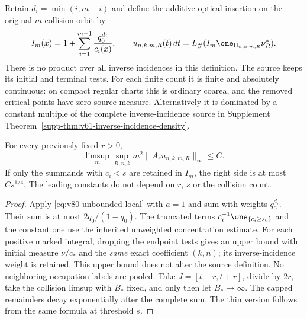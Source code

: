 Retain $d_i=\min(i,m-i)$ and define the additive optical insertion
on the original $m$-collision orbit by
\begin{equation}\label{eq:v80-depth-insertion}
 I_m(x)=1+\sum_{i=1}^{m-1}\frac{q_0^{d_i}}{c_i(x)},\qquad
 u_{n,k,m,R}(t)\,dt
       =L_\#(I_m\one_{\Pi_{n,k,m,R}}\nu_R^*).
\end{equation}
There is no product over all inverse incidences in this definition.
The source keeps its initial and terminal tests. For each finite
count it is finite and absolutely continuous: on compact regular
charts this is ordinary coarea, and the removed critical points
have zero source measure. Alternatively it is dominated by a
constant multiple of the complete inverse-incidence source in
Supplement Theorem~\ref{supp-thm:v61-inverse-incidence-density}.

\begin{corollary}
\label{cor:v80-depth-source}
For every previously fixed $r>0$,
\begin{equation}\label{eq:v80-depth-source}
 \limsup_m\sup_{R,n,k}m^2\|A_r u_{n,k,m,R}\|_\infty\le C.
\end{equation}
If only the summands with $c_i<s$ are retained in $I_m$, the right
side is at most $Cs^{1/4}$. The leading constants do not depend on
$r$, $s$ or the collision count.
\end{corollary}
\begin{proof}
Apply \eqref{eq:v80-unbounded-local} with $a=1$ and sum with
weights $q_0^{d_i}$. Their sum is at most $2q_0/(1-q_0)$.
The truncated terms $c_i^{-1}\one_{\{c_i\ge s_0\}}$ and the
constant one use the inherited unweighted concentration estimate.
For each positive marked integral, dropping the endpoint tests
gives an upper bound with initial measure $\nu/c_*$ and the
\emph{same} exact coefficient $(k,n)$; its inverse-incidence
weight is retained. This upper bound does not alter the source
definition. No neighboring occupation labels
are pooled. Take $J=[t-r,t+r]$, divide by $2r$, take the collision
limsup with $B_*$ fixed, and only then let $B_*\to\infty$.
The capped remainders decay exponentially after the complete sum.
The thin version follows from the same formula at threshold $s$.
\end{proof}

